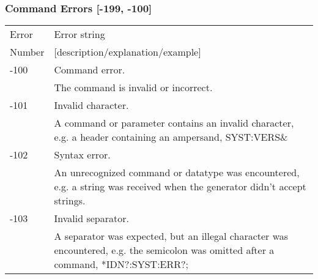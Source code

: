 \subsubsection{Command Errors [-199, -100]}

\begin{longtable}{|l|p{25em}|}
\hline
Error			& Error string \\ 
Number		& [description/explanation/example] \\ \hline
-100			& Command error.  \\ \cline{2-2}
					& The command is invalid or incorrect. \\ \hline
-101			& Invalid character. \\ \cline{2-2}
					& A command or parameter contains an invalid character, e.g. a header containing an ampersand,
SYST:VERS\&\\ \hline
-102			& Syntax error. \\ \cline{2-2}
					& An unrecognized command or datatype was encountered, e.g. a string was received when the generator didn't accept strings.\\ \hline
-103			& Invalid separator.\\ \cline{2-2}
					& A separator was expected, but an illegal character was encountered, e.g. the semicolon was omitted after a command, *IDN?:SYST:ERR?;\\ \hline
					

\end{longtable}
